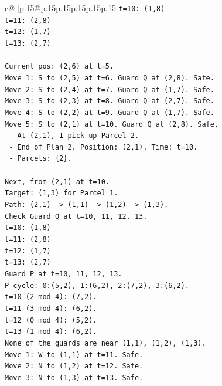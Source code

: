 \documentclass{article}
\begin{document}
{\begin{supertabular}{c@{$\;$}|p{.15\linewidth}@{}p{.15\linewidth}p{.15\linewidth}p{.15\linewidth}p{.15\linewidth}p{.15\linewidth}}
{{{\texttt{t=10: (1,8)} \\
\texttt{t=11: (2,8)} \\
\texttt{t=12: (1,7)} \\
\texttt{t=13: (2,7)} \\
\\ 
\texttt{Current pos: (2,6) at t=5.} \\
\texttt{Move 1: S to (2,5) at t=6. Guard Q at (2,8). Safe.} \\
\texttt{Move 2: S to (2,4) at t=7. Guard Q at (1,7). Safe.} \\
\texttt{Move 3: S to (2,3) at t=8. Guard Q at (2,7). Safe.} \\
\texttt{Move 4: S to (2,2) at t=9. Guard Q at (1,7). Safe.} \\
\texttt{Move 5: S to (2,1) at t=10. Guard Q at (2,8). Safe.} \\
\texttt{  {-} At (2,1), I pick up Parcel 2.} \\
\texttt{  {-} End of Plan 2. Position: (2,1). Time: t=10.} \\
\texttt{  {-} Parcels: \{2\}.} \\
\\ 
\texttt{Next, from (2,1) at t=10.} \\
\texttt{Target: (1,3) for Parcel 1.} \\
\texttt{Path: (2,1) {-}> (1,1) {-}> (1,2) {-}> (1,3).} \\
\texttt{Check Guard Q at t=10, 11, 12, 13.} \\
\texttt{t=10: (1,8)} \\
\texttt{t=11: (2,8)} \\
\texttt{t=12: (1,7)} \\
\texttt{t=13: (2,7)} \\
\texttt{Guard P at t=10, 11, 12, 13.} \\
\texttt{P cycle: 0:(5,2), 1:(6,2), 2:(7,2), 3:(6,2).} \\
\texttt{t=10 (2 mod 4): (7,2).} \\
\texttt{t=11 (3 mod 4): (6,2).} \\
\texttt{t=12 (0 mod 4): (5,2).} \\
\texttt{t=13 (1 mod 4): (6,2).} \\
\texttt{None of the guards are near (1,1), (1,2), (1,3).} \\
\texttt{Move 1: W to (1,1) at t=11. Safe.} \\
\texttt{Move 2: N to (1,2) at t=12. Safe.} \\
\texttt{Move 3: N to (1,3) at t=13. Safe.} \\
}}}
\end{supertabular}}
\end{document}
